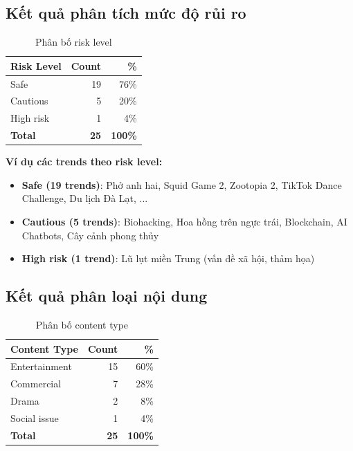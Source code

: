 \subsection{Kết quả phân tích mức độ rủi ro}

\begin{table}[H]
    \centering
    \begin{tabular}{|l|r|r|}
    \hline
    \textbf{Risk Level} & \textbf{Count} & \textbf{\%} \\
    \hline
    Safe & 19 & 76\% \\
    Cautious & 5 & 20\% \\
    High risk & 1 & 4\% \\
    \hline
    \textbf{Total} & \textbf{25} & \textbf{100\%} \\
    \hline
    \end{tabular}
    \caption{Phân bố risk level}
    \label{table:risk_results}
\end{table}

\textbf{Ví dụ các trends theo risk level:}
\begin{itemize}
    \item \textbf{Safe (19 trends)}: Phở anh hai, Squid Game 2, Zootopia 2, TikTok Dance Challenge, Du lịch Đà Lạt, ...
    \item \textbf{Cautious (5 trends)}: Biohacking, Hoa hồng trên ngực trái, Blockchain, AI Chatbots, Cây cảnh phong thủy
    \item \textbf{High risk (1 trend)}: Lũ lụt miền Trung (vấn đề xã hội, thảm họa)
\end{itemize}

\subsection{Kết quả phân loại nội dung}

\begin{table}[H]
    \centering
    \begin{tabular}{|l|r|r|}
    \hline
    \textbf{Content Type} & \textbf{Count} & \textbf{\%} \\
    \hline
    Entertainment & 15 & 60\% \\
    Commercial & 7 & 28\% \\
    Drama & 2 & 8\% \\
    Social issue & 1 & 4\% \\
    \hline
    \textbf{Total} & \textbf{25} & \textbf{100\%} \\
    \hline
    \end{tabular}
    \caption{Phân bố content type}
    \label{table:content_type_results}
\end{table}

